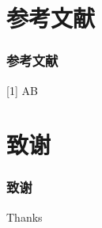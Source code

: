 \documentclass[notheorems,mathserif,table]{beamer}
\begin{document}
\begin{CJK*}{GBK}{kai}
\section{参考文献}
\begin{frame}\frametitle{参考文献}
[1] A\newline
[2] B
\end{frame}
\section{致谢}
\begin{frame}\frametitle{致谢}
Thanks
\end{frame}
\end{CJK*}
\end{document}
